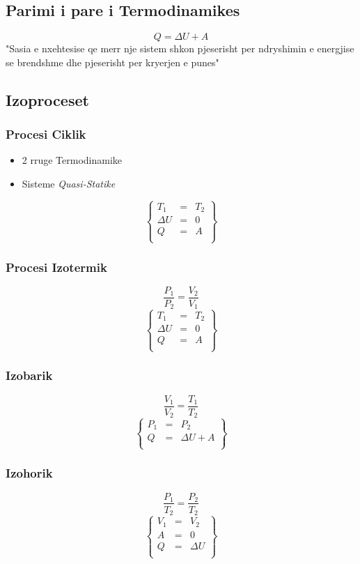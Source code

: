 \documentclass[a4paper, twocolumn]{article}
\begin{document}
\subsection{Parimi i pare i Termodinamikes}
\[
Q=\Delta U + A
\] 
"Sasia e nxehtesise qe merr nje sistem shkon pjeserisht per ndryshimin e energjise se brendshme dhe pjeserisht per kryerjen e punes"

\subsection{Izoproceset}
\subsubsection{Procesi Ciklik}
\begin{itemize}
	\item 2 rruge Termodinamike
	\item Sisteme \emph{Quasi-Statike}
\end{itemize}
\[
\begin{Bmatrix}
T_{1}&=& T_{2} \\
\Delta U &=& 0 \\
Q &=& A \\
\end{Bmatrix}
\] 
\subsubsection{Procesi Izotermik}
 \[
\frac{P_{1}}{P_{2}} = \frac{V_{2}}{V_{1}}
\] 
\[
\begin{Bmatrix}
T_{1}&=&T_{2} \\
\Delta U &=& 0 \\
Q &= &A \\
\end{Bmatrix}
\]
\subsubsection{Izobarik}
\[
\frac{V_{1}}{V_{2}} = \frac{T_{1}}{T_{2}}
\] 
\[
\begin{Bmatrix}
P_{1}&= &P_{2} \\
Q&=&\Delta U + A\\
\end{Bmatrix}
\]
\subsubsection{Izohorik}
\[
\frac{P_{1}}{T_{2}} = \frac{P_{2}}{T_{2}}
\] 
\[
\begin{Bmatrix}
V_{1}&=& V_{2} \\
A&=&0\\
Q&=&\Delta U\\
\end{Bmatrix}
\]
\end{document}
